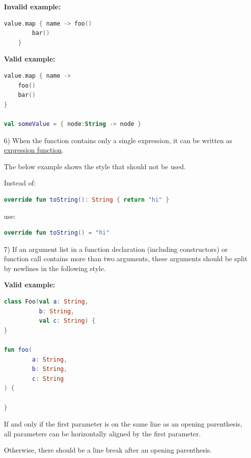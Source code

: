 {{{{{{{{{{{{{{{{{{\textbf{Invalid example:}

\begin{lstlisting}[language=Kotlin]
    value.map { name -> foo()
        bar()
    }
\end{lstlisting}


\textbf{Valid example:} 

\begin{lstlisting}[language=Kotlin]
value.map { name ->
    foo()
    bar()
}

val someValue = { node:String -> node }
\end{lstlisting}


6) When the function contains only a single expression, it can be written as \href{https://kotlinlang.org/docs/reference/functions.html#single-expression-functions}{expression function}. 

   The below example shows the style that should not be used.

   

Instead of: 

\begin{lstlisting}[language=Kotlin]
override fun toString(): String { return "hi" }
\end{lstlisting}
use:

\begin{lstlisting}[language=Kotlin]
override fun toString() = "hi"
\end{lstlisting}


7)  If an argument list in a function declaration (including constructors) or function call contains more than two arguments, these arguments should be split by newlines in the following style.



\textbf{Valid example:} 

\begin{lstlisting}[language=Kotlin]
class Foo(val a: String,
          b: String,
          val c: String) {
}

fun foo(
        a: String,
        b: String,
        c: String
) {

}
\end{lstlisting}


If and only if the first parameter is on the same line as an opening parenthesis, all parameters can be horizontally aligned by the first parameter.

Otherwise, there should be a line break after an opening parenthesis.



}}}}}}}}}}}}}}}}}}
